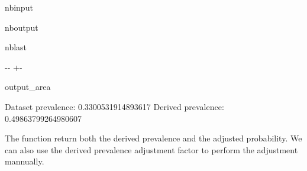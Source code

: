 \documentclass[letterpaper,10pt,english]{sphinxmanual}
\begin{document}
\begin{sphinxuseclass}{nbinput}
{\begin{sphinxVerbatim}[commandchars=\\\{\}]
   
\PYG{p}{[}\PYG{p}{]}  

  \PYG{p}{[}\PYG{p}{]}
  \PYG{p}{[}\PYG{p}{]}
    
 
 
\end{sphinxVerbatim}
}

\end{sphinxuseclass}
\begin{sphinxuseclass}{nboutput}
\begin{sphinxuseclass}{nblast}
{

\kern-\sphinxverbatimsmallskipamount\kern-\baselineskip
\kern+\FrameHeightAdjust\kern-\fboxrule
\vspace{\nbsphinxcodecellspacing}

\begin{sphinxuseclass}{output_area}
\begin{sphinxuseclass}{}


\begin{sphinxVerbatim}[commandchars=\\\{\}]
Dataset prevalence:  0.3300531914893617
Derived prevalence:  0.49863799264980607
\end{sphinxVerbatim}



\end{sphinxuseclass}
\end{sphinxuseclass}
}

\end{sphinxuseclass}
\end{sphinxuseclass}
\sphinxAtStartPar
The function return both the derived prevalence and the adjusted probability. We can also use the derived prevalence adjustment factor to perform the adjustment mannually.
\end{document}
